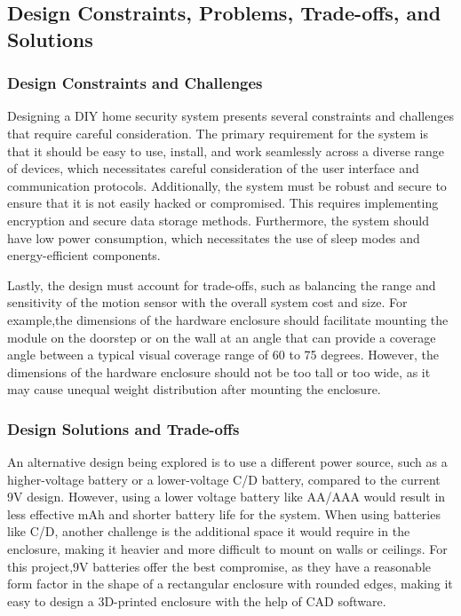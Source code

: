 \subsection{Design Constraints, Problems, Trade-offs, and Solutions}\label{subsec:design-constraints-problems-trade-offs-and-solutions}

\subsubsection{Design Constraints and Challenges}

Designing a DIY home security system presents several constraints and challenges that
require careful consideration. %
The primary requirement for the system is that it should be easy to use, install, and work seamlessly across a diverse range of devices, which
necessitates careful consideration of the user interface and communication protocols. %
Additionally, the system must be robust and secure to ensure that it is not easily
hacked or compromised. %
This requires implementing encryption and secure data storage methods. %
Furthermore, the system should have low power consumption, which
necessitates the use of sleep modes and energy-efficient components. %

Lastly, the design must account for trade-offs, such as balancing the range and
sensitivity of the motion sensor with the overall system cost and size.
For example,the dimensions of the hardware enclosure should facilitate mounting the module on the
doorstep or on the wall at an angle that can provide a coverage angle between a
typical visual coverage range of 60 to 75 degrees. %
However, the dimensions of the hardware enclosure should not be too tall or too wide, as it may cause unequal weight
distribution after mounting the enclosure. %

\subsubsection{Design Solutions and Trade-offs}

An alternative design being explored is to use a different power source,
such as a higher-voltage battery or a lower-voltage C/D battery, compared to the
current 9V design. %
However, using a lower voltage battery like AA/AAA would result in less effective mAh and shorter battery life for the system. %
When using batteries like C/D, another challenge is the additional space it would require in the enclosure,
making it heavier and more difficult to mount on walls or ceilings. %
For this project,9V batteries offer the best compromise, as they have a reasonable form factor in the
shape of a rectangular enclosure with rounded edges, making it easy to design a
3D-printed enclosure with the help of CAD software. %

